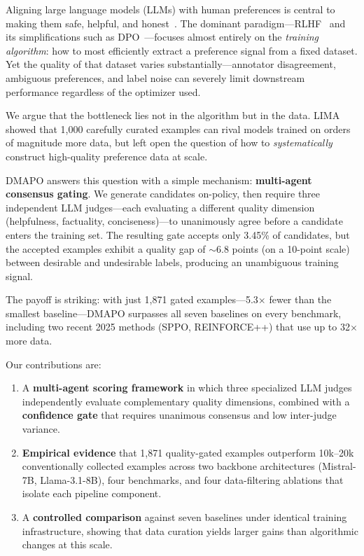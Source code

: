 \documentclass{article}
\newcommand{\method}{DMAPO}
\begin{document}
Aligning large language models (LLMs) with human preferences is central to making them safe, helpful, and honest~\citep{ouyang2022training, bai2022training,wang2026juli}. The dominant paradigm---RLHF~\citep{christiano2017deep, stiennon2020learning} and its simplifications such as DPO~\citep{rafailov2023dpo}---focuses almost entirely on the \emph{training algorithm}: how to most efficiently extract a preference signal from a fixed dataset. Yet the quality of that dataset varies substantially---annotator disagreement, ambiguous preferences, and label noise can severely limit downstream performance regardless of the optimizer used.

We argue that the bottleneck lies not in the algorithm but in the data. LIMA~\citep{zhou2023lima} showed that 1,000 carefully curated examples can rival models trained on orders of magnitude more data, but left open the question of how to \emph{systematically} construct high-quality preference data at scale.

\method{} answers this question with a simple mechanism: \textbf{multi-agent consensus gating}. We generate candidates on-policy, then require three independent LLM judges---each evaluating a different quality dimension (helpfulness, factuality, conciseness)---to unanimously agree before a candidate enters the training set. The resulting gate accepts only 3.45\% of candidates, but the accepted examples exhibit a quality gap of $\sim$6.8 points (on a 10-point scale) between desirable and undesirable labels, producing an unambiguous training signal.

The payoff is striking: with just 1,871 gated examples---5.3$\times$ fewer than the smallest baseline---\method{} surpasses all seven baselines on every benchmark, including two recent 2025 methods (SPPO, REINFORCE++) that use up to 32$\times$ more data.

Our contributions are:
\begin{enumerate}
    \item A \textbf{multi-agent scoring framework} in which three specialized LLM judges independently evaluate complementary quality dimensions, combined with a \textbf{confidence gate} that requires unanimous consensus and low inter-judge variance.
    \item \textbf{Empirical evidence} that 1,871 quality-gated examples outperform 10k--20k conventionally collected examples across two backbone architectures (Mistral-7B, Llama-3.1-8B), four benchmarks, and four data-filtering ablations that isolate each pipeline component.
    \item A \textbf{controlled comparison} against seven baselines under identical training infrastructure, showing that data curation yields larger gains than algorithmic changes at this scale.
\end{enumerate}
\end{document}

